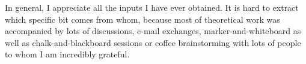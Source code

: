 In general, I appreciate all
the inputs I have ever obtained. It is hard to extract which specific bit comes
from whom, because most of theoretical work was accompanied by lots of
discussions, e-mail exchanges, marker-and-whiteboard as well as
chalk-and-blackboard sessions or coffee brainstorming with lots of people
to whom I am incredibly grateful.


